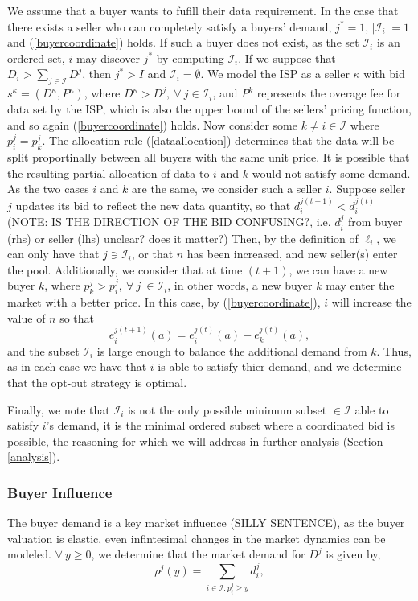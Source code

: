 \documentclass[12pt]{article}
\theoremstyle{definition}
\newcommand{\mcI}{\mathcal{I}}
\begin{document}
\begin{multicols}{2}
We assume that a buyer wants to fufill their data requirement.
In the case that there exists a seller who can completely satisfy a buyers'
demand, $j^*=1$, $\vert \mcI_i\vert =1$ and (\ref{buyercoordinate}) holds. If such a buyer does not exist,
as the set $\mcI_i$ is an ordered set, $i$ may discover 
$j^*$ by computing $\mcI_i$.
If we suppose that $D_i >
\sum_{j\in\mcI}D^j$, then $j^* > I$ and $\mcI_i = \emptyset$. 
We model the ISP as a seller $\kappa$ with bid $s^\kappa =(D^\kappa, P^\kappa)$,
where $D^\kappa > D^j, \
\forall \ j\in\mcI_i$, and
$P^k$ represents the overage fee for data set by the ISP, which is also the upper bound of the sellers'
pricing function, and so again (\ref{buyercoordinate}) holds.
Now consider some $k \ne i \in \mcI$ where $p_i^j = p_k^j$. 
The allocation rule (\ref{dataallocation}) determines that the data will be split proportinally
between all buyers with the same unit price. 
It is possible that the resulting partial allocation of data to $i$ and $k$
would not satisfy some demand. As the two cases $i$ and $k$ are the same, we consider such
a seller $i$. Suppose seller $j$ updates its
bid to reflect the new data quantity, so that $d_i^{j(t+1)} < d_i^{j(t)}$ (NOTE:
IS THE DIRECTION OF THE BID CONFUSING?, i.e. $d_i^j$ from buyer (rhs) or seller
(lhs) unclear? does it matter?) Then, by the definition of $\ell_i$, we can
only have that $j \ni \mcI_i$, or that $n$ has been increased, and new seller(s)
enter the pool. 
Additionally, we consider that at time $(t+1)$, we can have a 
new buyer $k$, where $p_k^j > p_i^j, \ \forall \ j \ \in \mcI_i$, in other
words, a new buyer $k$ may enter the market with a better price. In this case, by (\ref{buyercoordinate}), $i$ will increase the value of
$n$ so that
$$
    e_i^{j(t+1)}(a) = e_i^{j(t)}(a) - e_k^{j(t)}(a),
$$
and the subset $\mcI_i$ is large enough to balance the additional demand from
$k$. Thus, as in each case we have that $i$ is able to satisfy thier demand,
and we determine that the opt-out strategy is optimal.

Finally, we note that $\mcI_i$ is not the only
possible minimum subset $\in\mcI$ able to satisfy $i$'s demand, it is the
minimal ordered subset where a
coordinated bid is possible, the reasoning for which we will address in further analysis (Section
\ref{analysis}). 

\subsubsection{Buyer Influence}
The buyer demand is a key market influence (SILLY SENTENCE), as the buyer
valuation is elastic, even infintesimal changes in the market dynamics can be
modeled. $\forall \ y\ge 0$, we determine that the market demand for $D^j$ is given by,
\begin{equation}\label{datademand}
    \rho^j(y) = \sum_{i\in\mcI : p_i^j\ge y} d_i^j, 
\end{equation}


\end{multicols}
\end{document}
